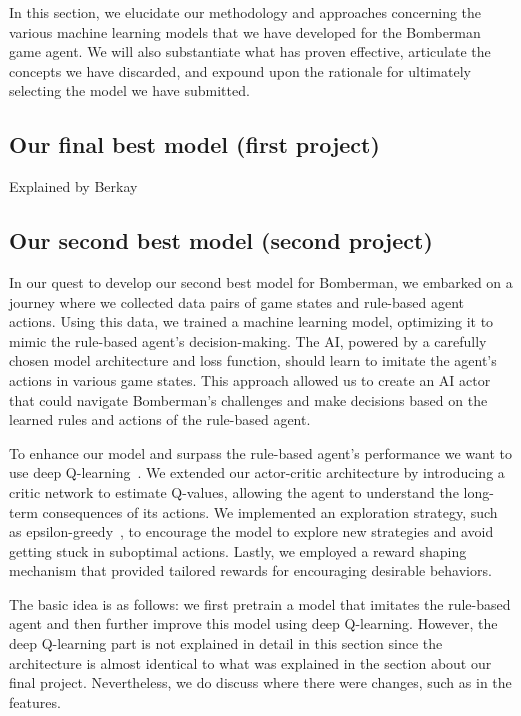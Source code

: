 In this section, we elucidate our methodology and approaches concerning the various machine learning models 
that we have developed for the Bomberman game agent. We will also substantiate what has proven effective, articulate 
the concepts we have discarded, and expound upon the rationale for ultimately selecting the model we have submitted.

\subsection{Our final best model (first project)}

Explained by Berkay

\subsection{Our second best model (second project)}

In our quest to develop our second best model for Bomberman, we embarked on a journey where we collected data pairs of game 
states and rule-based agent actions. Using this data, we trained a machine learning model, optimizing it to mimic 
the rule-based agent's decision-making. The AI, powered by a carefully chosen model architecture and loss function, 
should learn to imitate the agent's actions in various game states. This approach allowed us to create an AI actor 
that could navigate Bomberman's challenges and make decisions based on the learned rules and actions of the rule-based agent.

To enhance our model and surpass the rule-based agent's performance we want to use deep Q-learning~\cite{Art:torchQlearn}. We extended our actor-critic architecture by 
introducing a critic network to estimate Q-values, allowing the agent to understand the long-term consequences of its actions. 
We implemented an exploration strategy, such as epsilon-greedy~\cite{Onl:greedy}, to encourage the model to explore new strategies and avoid getting 
stuck in suboptimal actions. Lastly, we employed a reward shaping mechanism that provided tailored rewards for encouraging desirable behaviors.

The basic idea is as follows: we first pretrain a model that imitates the rule-based agent and then further improve this model using deep Q-learning. 
However, the deep Q-learning part is not explained in detail in this section since the architecture is almost identical to what was explained in the 
section about our final project. Nevertheless, we do discuss where there were changes, such as in the features.

